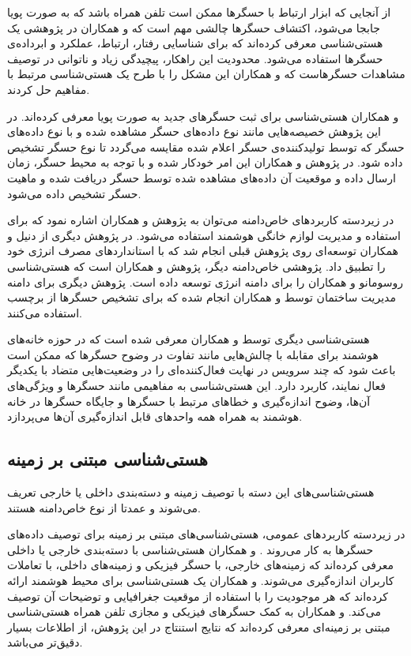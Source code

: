 از آنجایی که ابزار ارتباط با حسگرها ممکن است تلفن همراه باشد که به صورت پویا جابجا می‌شود، اکتشاف حسگرها چالشی مهم است که  و همکاران \cite{x232Z13} در پژوهشی یک هستی‌شناسی معرفی کرده‌اند که برای شناسایی رفتار، ارتباط، عملکرد و ابرداده‌ی حسگرها استفاده می‌شود. محدودیت این راهکار، پیچیدگی زیاد و ناتوانی در توصیف مشاهدات حسگرهاست که  و همکاران \cite{x232Z14} این مشکل را با طرح یک هستی‌شناسی مرتبط با مفاهیم  حل کردند.

 و همکاران \cite{x232Z15} هستی‌شناسی برای ثبت حسگرهای جدید به صورت پویا معرفی کرده‌اند. در این پژوهش خصیصه‌هایی مانند نوع داده‌های حسگر مشاهده شده و با نوع داده‌های حسگر که توسط تولیدکننده‌ی حسگر اعلام شده مقایسه می‌گردد تا نوع حسگر تشخیص داده شود. در پژوهش  و همکاران \cite{x232Z16} این امر خودکار شده و با توجه به محیط حسگر، زمان ارسال داده و موقعیت آن داده‌های مشاهده شده توسط حسگر دریافت شده و ماهیت حسگر تشخیص داده می‌شود.

در زیردسته کاربردهای خاص‌دامنه می‌توان به پژوهش  و همکاران \cite{x232Z17} اشاره نمود که برای استفاده و مدیریت لوازم خانگی هوشمند استفاده می‌شود. در پژوهش دیگری از دنیل و همکاران \cite{x232Z18} توسعه‌ای روی پژوهش قبلی انجام شد که با استانداردهای مصرف انرژی خود را تطبیق داد. پژوهشی خاص‌دامنه دیگر، پژوهش  و همکاران \cite{x232Z19} است که هستی‌شناسی روسومانو و همکاران \cite{x232Z13} را برای دامنه انرژی توسعه داده است. پژوهش دیگری برای دامنه مدیریت ساختمان توسط  و همکاران \cite{x232Z1A} انجام شده که برای تشخیص حسگرها از برچسب استفاده می‌کنند.

هستی‌شناسی دیگری توسط  و همکاران \cite{x232Z1} معرفی شده است که در حوزه خانه‌‌های هوشمند برای مقابله با چالش‌هایی مانند تفاوت در وضوح حسگرها که ممکن است باعث شود که چند سرویس در نهایت فعال‌‌کننده‌‌ای را در وضعیت‌هایی متضاد با یکدیگر فعال نمایند، کاربرد دارد. این هستی‌شناسی به مفاهیمی مانند حسگرها و ويژگی‌‌های آن‌ها، وضوح اندازه‌گیری و خطاهای مرتبط با حسگرها و جایگاه حسگرها در خانه هوشمند به همراه همه واحدهای قابل اندازه‌گیری آن‌ها می‌‌پردازد. 

\subsection{‌هستی‌شناسی مبتنی بر زمینه}

هستی‌شناسی‌های این دسته با توصیف زمینه و دسته‌بندی داخلی یا خارجی تعریف می‌شوند \cite{x232Z22} و عمدتا از نوع خاص‌دامنه هستند.

در زیردسته کاربردهای عمومی، هستی‌شناسی‌های مبتنی بر زمینه برای توصیف داده‌های حسگرها به کار می‌روند \cite{x232Z21}.  و همکاران \cite{x232Z22} هستی‌شناسی با دسته‌بندی خارجی یا داخلی معرفی کرده‌اند که زمینه‌های خارجی، با حسگر فیزیکی و زمینه‌های داخلی، با تعاملات کاربران اندازه‌گیری می‌شوند.  و همکاران \cite{x232Z23} یک هستی‌شناسی برای محیط هوشمند ارائه کرده‌اند که هر موجودیت را با استفاده از موقعیت جغرافیایی و توضیحات آن توصیف می‌کند.  و همکاران \cite{x232Z4} به کمک حسگرهای فیزیکی و مجازی تلفن همراه هستی‌شناسی مبتنی بر زمینه‌ای معرفی کرده‌اند که نتایج استنتاج در این پژوهش، از اطلاعات  بسیار دقیق‌تر می‌باشد.

